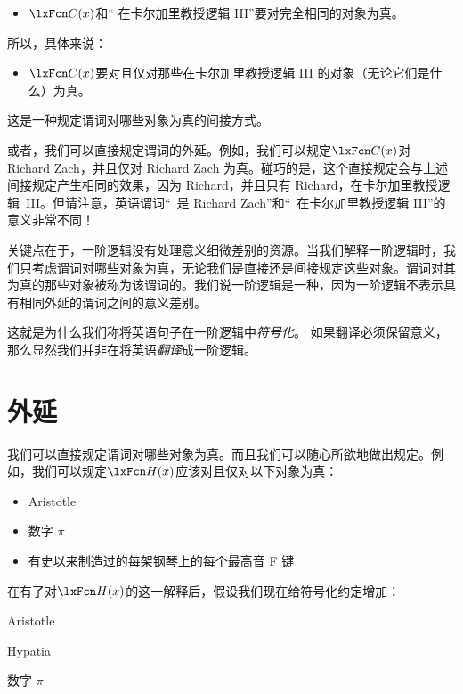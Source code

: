 \begin{itemize}
		\item$\atom{C}{x}$和“ 在卡尔加里教授逻辑 III”要对完全相同的对象为真。
	\end{itemize}


所以，具体来说：


\begin{itemize}
		\item$\atom{C}{x}$要对且仅对那些在卡尔加里教授逻辑 III 的对象（无论它们是什么）为真。
	\end{itemize}


这是一种规定谓词对哪些对象为真的间接方式。

或者，我们可以直接规定谓词的外延。例如，我们可以规定$\atom{C}{x}$对 Richard Zach，并且仅对 Richard Zach 为真。碰巧的是，这个直接规定会与上述间接规定产生相同的效果，因为 Richard，并且只有 Richard，在卡尔加里教授逻辑~III。但请注意，英语谓词“\blank\ 是 Richard Zach”和“\blank\ 在卡尔加里教授逻辑 III”的意义非常不同！

关键点在于，一阶逻辑没有处理意义细微差别的资源。当我们解释一阶逻辑时，我们只考虑谓词对哪些对象为真，无论我们是直接还是间接规定这些对象。谓词对其为真的那些对象被称为该谓词的。我们说一阶逻辑是一种，因为一阶逻辑不表示具有相同外延的谓词之间的意义差别。

这就是为什么我们称将英语句子在一阶逻辑中\emph{符号化}。
如果翻译必须保留意义，那么显然我们并非在将英语\emph{翻译}成一阶逻辑。

\section{外延}\label{sec:extensions}
我们可以直接规定谓词对哪些对象为真。而且我们可以随心所欲地做出规定。例如，我们可以规定$\atom{H}{x}$应该对且仅对以下对象为真：


\begin{itemize}
		\item Aristotle
		\item 数字 $\pi$
		\item 有史以来制造过的每架钢琴上的每个最高音 F 键
	\end{itemize}


在有了对$\atom{H}{x}$的这一解释后，假设我们现在给符号化约定增加：


\begin{ekey}
		\item[a] Aristotle
		\item[h] Hypatia
		\item[p] 数字 $\pi$
	\end{ekey}


